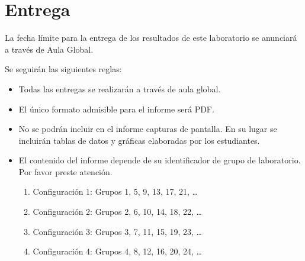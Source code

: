 \clearpage
\section{Entrega}

La fecha límite para la entrega de los resultados de este laboratorio 
se anunciará a través de Aula Global.

Se seguirán las siguientes reglas:

\begin{itemize}

  \item Todas las entregas se realizarán a través de aula global.

  \item El único formato admisible para el informe será PDF.

  \item No se podrán incluir en el informe capturas de pantalla.
        En su lugar se incluirán tablas de datos y gráficas elaboradas por los estudiantes.

  \item El contenido del informe depende de su identificador de grupo de laboratorio.
        Por favor preste atención.
  
  \begin{enumerate}
    \item Configuración 1: Grupos 1, 5, 9, 13, 17, 21, \ldots
    \item Configuración 2: Grupos 2, 6, 10, 14, 18, 22, \ldots
    \item Configuración 3: Grupos 3, 7, 11, 15, 19, 23, \ldots
    \item Configuración 4: Grupos 4, 8, 12, 16, 20, 24, \ldots
  \end{enumerate}
  
\end{itemize}
